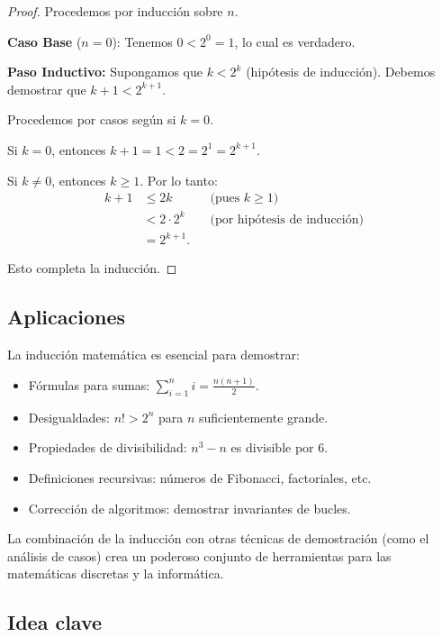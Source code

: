 \begin{proof}
Procedemos por inducción sobre $n$.

\textbf{Caso Base} ($n = 0$): Tenemos $0 < 2^0 = 1$, lo cual es
verdadero.

\textbf{Paso Inductivo:} Supongamos que $k < 2^k$ (hipótesis de
inducción). Debemos demostrar que $k + 1 < 2^{k+1}$.

Procedemos por casos según si $k = 0$.

Si $k = 0$, entonces $k + 1 = 1 < 2 = 2^1 = 2^{k+1}$.

Si $k \neq 0$, entonces $k \geq 1$. Por lo tanto:
\begin{align*}
  k + 1 &\leq 2k   && \text{(pues } k \geq 1\text{)} \\
        &< 2 \cdot 2^k && \text{(por hipótesis de inducción)} \\
        &= 2^{k+1}.
\end{align*}

Esto completa la inducción.
\end{proof}

\subsection{Aplicaciones}

La inducción matemática es esencial para demostrar:

\begin{itemize}
  \item Fórmulas para sumas: $\displaystyle\sum_{i=1}^{n} i =
        \frac{n(n+1)}{2}$.
  \item Desigualdades: $n! > 2^n$ para $n$ suficientemente grande.
  \item Propiedades de divisibilidad: $n^3 - n$ es divisible por 6.
  \item Definiciones recursivas: números de Fibonacci, factoriales, etc.
  \item Corrección de algoritmos: demostrar invariantes de bucles.
\end{itemize}

La combinación de la inducción con otras técnicas de demostración (como el
análisis de casos) crea un poderoso conjunto de herramientas para las
matemáticas discretas y la informática.

\subsection{Idea clave}

